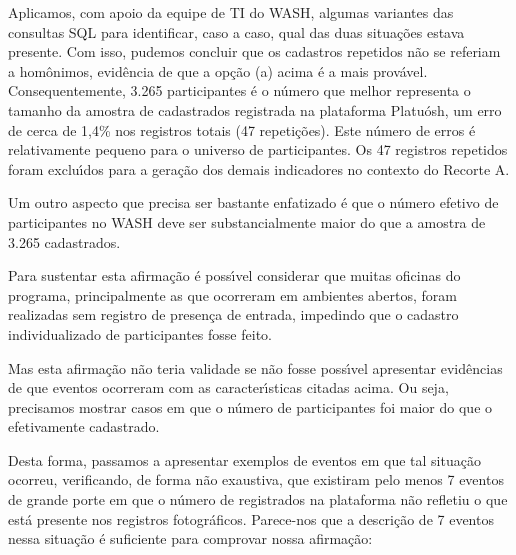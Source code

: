 \documentclass[
12pt,		%
openright,	%
twoside,  %
a4paper,			%
chapter=TITLE,		%
english,			%
french,				%
spanish,			%
brazil				%
]{USPSC-classe/USPSC}
\begin{document}
Aplicamos, com apoio da equipe de TI do WASH, algumas variantes das consultas SQL para identificar, caso a caso, qual das duas situa\c{c}\~oes estava presente. Com isso, pudemos concluir que os cadastros repetidos n\~ao se referiam a hom\^onimos, evid\^encia de que a op\c{c}\~ao (a) acima \'e a mais prov\'avel. Consequentemente, 3.265 participantes \'e o n\'umero que melhor representa o tamanho da amostra de cadastrados registrada na plataforma Platu\'osh, um erro de cerca de 1,4\% nos registros totais (47 repeti\c{c}\~oes). Este n\'umero de erros \'e relativamente pequeno para o universo de participantes. Os 47 registros repetidos foram exclu\'{\i}dos para a gera\c{c}\~ao dos demais indicadores no contexto do Recorte A.









\noindent\begin{center}\mbox{\centering{}}\end{center}


Um outro aspecto que precisa ser bastante enfatizado \'e que o n\'umero efetivo de participantes no WASH deve ser substancialmente maior do que a amostra de 3.265 cadastrados.








Para sustentar esta afirma\c{c}\~ao \'e poss\'{\i}vel considerar que muitas oficinas do programa, principalmente as que ocorreram em ambientes abertos, foram realizadas sem registro de presen\c{c}a  de entrada, impedindo que o cadastro individualizado de participantes fosse feito.








Mas esta afirma\c{c}\~ao n\~ao teria validade se n\~ao fosse poss\'{\i}vel apresentar evid\^encias de que eventos ocorreram com as caracter\'{\i}sticas citadas acima. Ou seja, precisamos mostrar casos em que o n\'umero de participantes foi maior do que o efetivamente cadastrado.








Desta forma, passamos a apresentar exemplos de eventos em que tal situa\c{c}\~ao ocorreu, verificando, de forma n\~ao exaustiva, que existiram pelo menos 7 eventos de grande porte em que o n\'umero de registrados na plataforma n\~ao refletiu o que est\'a presente nos registros fotogr\'aficos. Parece-nos que a descri\c{c}\~ao de 7 eventos nessa situa\c{c}\~ao \'e suficiente para comprovar nossa afirma\c{c}\~ao:
\end{document}
